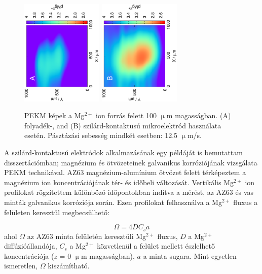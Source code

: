 \begin{figure}
\centering
\includegraphics[trim = 10mm 30mm 0mm 10mm, clip, width=0.35\textwidth, angle=-90]{img/mg_pipette/liquid_Mg.eps} \includegraphics[trim = 10mm 30mm 0mm 10mm, clip, width=0.35\textwidth, angle=-90]{img/mg_pipette/solid_Mg.eps}
\caption{PEKM képek a Mg$^{2+}$ ion forrás felett 100 $\upmu$m magasságban.
(A) folyadék-, and (B) szilárd-kontaktusú mikroelektród használata esetén.
Pásztázási sebesség mindkét esetben: 12.5 $\upmu$m/s.}
\label{fig:solid_liquid_pipette}
\end{figure}

A szilárd-kontaktusú elektródok alkalmazásának egy példáját is bemutattam disszertációmban; magnézium és ötvözeteinek galvanikus korróziójának vizsgálata PEKM technikával.
AZ63 magnézium-alumínium ötvözet felett térképeztem a magnézium ion koncentrációjának tér- és időbeli változását.
Vertikális Mg$^{2+}$ ion profilokat rögzítettem különböző időpontokban indítva a mérést, az AZ63 és vas minták galvanikus korróziója során.
Ezen profilokat felhasználva a Mg$^{2+}$ fluxus a felületen keresztül megbecsülhető:

\begin{equation}
\label{eq:corrosion_current}
        \Omega = 4 D C_s a
\end{equation}
ahol $\Omega$ az AZ63 minta felületén keresztüli Mg$^{2+}$ fluxus, $D$ a Mg$^{2+}$ diffúzióállandója, $C_s$ a Mg$^{2+}$ közvetlenül a felület mellett észlelhető koncentrációja ($z$ = 0 $\upmu$m magasságban), $a$ a minta sugara.
Mint egyetlen ismeretlen, $\Omega$ kiszámítható.

